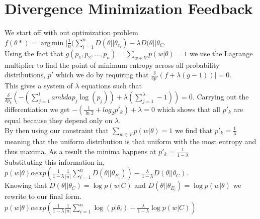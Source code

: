 \documentclass[11pt]{article}
\DeclareMathOperator*{\argmin}{arg\,min}
\begin{document}
\section{Divergence Minimization Feedback}
We start off with out optimization problem $f(\theta *) = \argmin [\frac{1}{n} (\sum_{i=1}^n D(\theta || \theta_{e_i}) - \lambda D(\theta || \theta_C$. \\ Using the fact that $g(p_1, p_2, ..., p_n) = \sum_{w \in V} p(w| \theta) = 1$ we use the Lagrange multiplier to find the point of minimum entropy across all probability distributions, $p'$ which we do by requiring that $\frac{\delta}{\delta p'} (f + \lambda(g-1))| = 0$. \\ This gives a system of $\lambda$ equations such that $\frac{\delta}{\delta p_k} (-(\sum_{j=1}^lambda p_j \log (p_j)) + \lambda(\sum_{j=1}^\lambda -1)) = 0$. Carrying out the differentiation we get $-(\frac{1}{\ln 2}+log_2 p'_k) + \lambda = 0$ which shows that all $p'_k$ are equal because they depend only on $\lambda$. \\
By then using our constraint that $\sum_{w \in V} p(w|\theta) = 1$ we find that $p'_k= \frac{1}{\lambda}$ meaning that the uniform distribution is that uniform with the most entropy and thus maxima. As a result the minima happens at  $p'_k= \frac{1}{1-\lambda}$\\
Substituting this information in, $p(w|\theta) \alpha exp(\frac{1}{1-\lambda}\frac{1}{|n|}\sum_{i=1}^n D(\theta || \theta_{E_i})) - \frac{\lambda}{1-\lambda} D(\theta || \theta_C)$. \\
Knowing that $D(\theta || \theta_C) = \log p(w|C)$ and $D(\theta || \theta_{E_i}) = \log p(w|\theta)$ we rewrite to our final form. $p(w|\theta) \alpha exp(\frac{1}{1-\lambda}\frac{1}{|n|}\sum_{i=1}^n \log(p|\theta_i) - \frac{\lambda}{1-\lambda}\log p(w|C))$
\end{document}
